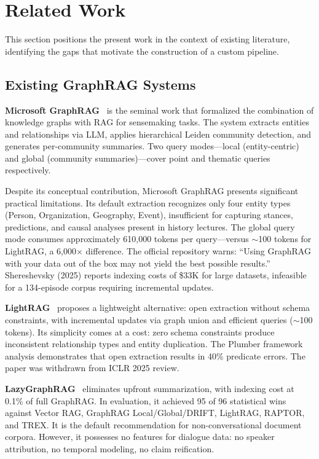 \section{Related Work}
\label{sec:related}

This section positions the present work in the context of existing literature, identifying the gaps that motivate the construction of a custom pipeline.

\subsection{Existing GraphRAG Systems}

\textbf{Microsoft GraphRAG}~\cite{edge2024graphrag} is the seminal work that formalized the combination of knowledge graphs with RAG for sensemaking tasks. The system extracts entities and relationships via LLM, applies hierarchical Leiden community detection, and generates per-community summaries. Two query modes---local (entity-centric) and global (community summaries)---cover point and thematic queries respectively.

Despite its conceptual contribution, Microsoft GraphRAG presents significant practical limitations. Its default extraction recognizes only four entity types (Person, Organization, Geography, Event), insufficient for capturing stances, predictions, and causal analyses present in history lectures. The global query mode consumes approximately 610,000 tokens per query---versus $\sim$100 tokens for LightRAG, a 6,000$\times$ difference. The official repository warns: ``Using GraphRAG with your data out of the box may not yield the best possible results.'' Shereshevsky (2025) reports indexing costs of \$33K for large datasets, infeasible for a 134-episode corpus requiring incremental updates.

\textbf{LightRAG}~\cite{guo2024lightrag} proposes a lightweight alternative: open extraction without schema constraints, with incremental updates via graph union and efficient queries ($\sim$100 tokens). Its simplicity comes at a cost: zero schema constraints produce inconsistent relationship types and entity duplication. The Plumber framework analysis demonstrates that open extraction results in 40\% predicate errors. The paper was withdrawn from ICLR 2025 review.

\textbf{LazyGraphRAG}~\cite{edge2024lazygraphrag} eliminates upfront summarization, with indexing cost at 0.1\% of full GraphRAG. In evaluation, it achieved 95 of 96 statistical wins against Vector RAG, GraphRAG Local/Global/DRIFT, LightRAG, RAPTOR, and TREX. It is the default recommendation for non-conversational document corpora. However, it possesses no features for dialogue data: no speaker attribution, no temporal modeling, no claim reification.

